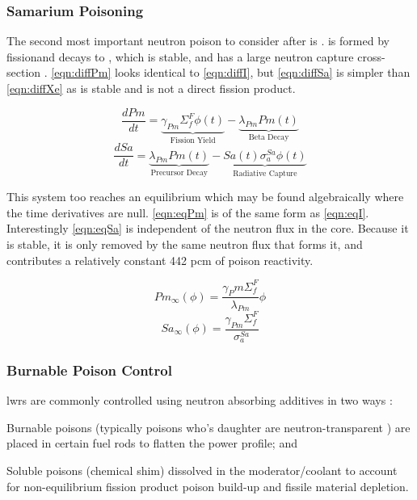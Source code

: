 \subsubsection{Samarium Poisoning}
The second most important neutron poison to consider after \Xe is \Sa. \Pm is formed by fission\footnotemark and decays to \Sa, which is stable, and has a large neutron capture cross-section \cite[Ch. 7]{Lamarsh}. \ref{eqn:diffPm} looks identical to \ref{eqn:diffI}, but \ref{eqn:diffSa} is simpler than \ref{eqn:diffXe} as \Sa is stable and is not a direct fission product.


\begin{equation}\label{eqn:diffPm}
    \frac{dPm}{dt} =
    \underbrace{\gamma_{Pm}\Sigma_{f}^{F}{\phi}(t)}_{\text{Fission Yield}}
    -\underbrace{\lambda_{Pm}Pm(t)}_{\text{Beta Decay}}
\end{equation}
\begin{equation}\label{eqn:diffSa}
        \frac{dSa}{dt} =
        \underbrace{\lambda_{Pm}Pm(t)}_{\text{Precursor Decay}}
        -
        \underbrace{Sa(t)\sigma_{a}^{Sa}{\phi}(t)}_{\text{Radiative Capture}}
\end{equation}

This system too reaches an equilibrium which may be found algebraically where the time derivatives are null. \ref{eqn:eqPm} is of the same form as \ref{eqn:eqI}. Interestingly \ref{eqn:eqSa} is independent of the neutron flux in the core. Because it is stable, it is only removed by the same neutron flux that forms it, and contributes a relatively constant 442 pcm of poison reactivity. 

\begin{equation}\label{eqn:eqPm}
    Pm_{\infty}(\phi) = \frac{\gamma_Pm \Sigma_f^F }{\lambda_{Pm}}\phi
\end{equation}
\begin{equation}\label{eqn:eqSa}
    Sa_{\infty}(\phi) = \frac{\gamma_{Pm} \Sigma_f^F }{\sigma_a^{Sa}}
\end{equation}

\subsubsection{Burnable Poison Control}
\acsp{lwr} are commonly controlled using neutron absorbing additives in two ways \cite[Ch. 8]{Kerlin}:
\begin{enumerate*}
    \item Burnable poisons (typically poisons who's daughter are neutron-transparent \cite[Ch. 14]{DH}) are placed in certain fuel rods to flatten the power profile; and 
    \item Soluble poisons (\ie chemical shim) dissolved in the moderator/coolant to account for non-equilibrium fission product poison build-up and fissile material depletion.
\end{enumerate*}

